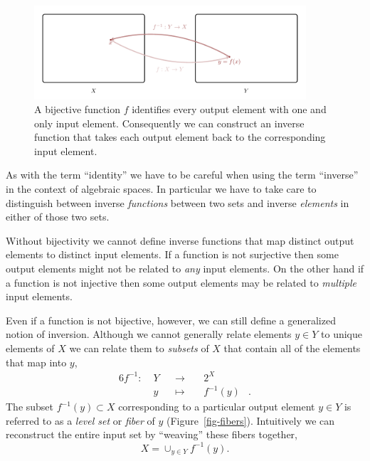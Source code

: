 \documentclass[
  letterpaper,
  DIV=11,
  numbers=noendperiod]{scrartcl}
\begin{document}
\begin{figure}

{\centering \includegraphics[width=0.9\textwidth,height=\textheight]{figures/maps/inverse/inverse.pdf}

}

\caption{\label{fig-function-inverse}A bijective function \(f\)
identifies every output element with one and only input element.
Consequently we can construct an inverse function that takes each output
element back to the corresponding input element.}

\end{figure}

As with the term ``identity'' we have to be careful when using the term
``inverse'' in the context of algebraic spaces. In particular we have to
take care to distinguish between inverse \emph{functions} between two
sets and inverse \emph{elements} in either of those two sets.

Without bijectivity we cannot define inverse functions that map distinct
output elements to distinct input elements. If a function is not
surjective then some output elements might not be related to \emph{any}
input elements. On the other hand if a function is not injective then
some output elements may be related to \emph{multiple} input elements.

Even if a function is not bijective, however, we can still define a
generalized notion of inversion. Although we cannot generally relate
elements \(y \in Y\) to unique elements of \(X\) we can relate them to
\emph{subsets} of \(X\) that contain all of the elements that map into
\(y\), \begin{alignat*}{6}
f^{-1} :\; & Y & &\rightarrow& \; & 2^X &
\\
& y & &\mapsto& & f^{-1}(y) &.
\end{alignat*} The subset \(f^{-1}(y) \subset X\) corresponding to a
particular output element \(y \in Y\) is referred to as a \emph{level
set} or \emph{fiber} of \(y\) (Figure~\ref{fig-fibers}). Intuitively we
can reconstruct the entire input set by ``weaving'' these fibers
together, \[
X = \cup_{y \in Y} f^{-1}(y).
\]
\end{document}
